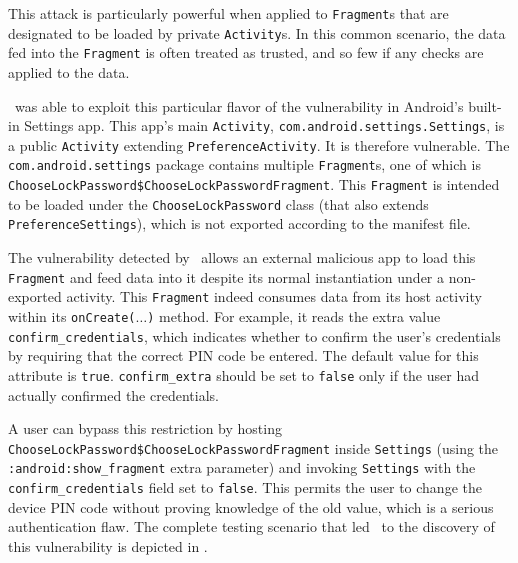This attack is particularly powerful when applied to {\tt Fragment}s that are designated to be loaded by private {\tt Activity}s. In this common scenario, the data fed into the {\tt Fragment} is often treated as trusted, and so few if any checks are applied to the data.

\Tool\ was able to exploit this particular flavor of the vulnerability in Android's built-in Settings app. This app's main {\tt Activity}, \texttt{com.android.settings.Settings},
is a public {\tt Activity}  extending \texttt{PreferenceActivity}.  It is therefore vulnerable. The
{\tt com.android.settings} package contains multiple {\tt Fragment}s, one of which is \texttt{ChooseLockPassword\$ChooseLockPasswordFragment}.
This {\tt Fragment} is intended to be loaded under the \texttt{ChooseLockPassword}
class (that also extends \texttt{PreferenceSettings}), which is not exported
according to the manifest file.

The vulnerability detected by \Tool\ allows an external malicious app to load this {\tt Fragment}
and feed data into it despite its normal instantiation under a non-exported
activity. This {\tt Fragment} indeed consumes data from its host activity
within its \texttt{onCreate($\ldots$)} method. For example, it reads the extra
value \texttt{confirm\_credentials}, which indicates whether to confirm the user's credentials
by requiring that the correct PIN code be entered. The default value for this
attribute is {\tt true}. \texttt{confirm\_extra} should be set to {\tt false}
only if the user had actually confirmed the credentials.

A user can bypass this restriction by hosting \texttt{ChooseLockPassword\$ChooseLockPasswordFragment}
inside \texttt{Settings} (using the \texttt{:android:show\_fragment}
extra parameter) and invoking \texttt{Settings} with the \texttt{confirm\_credentials}
field set to \texttt{false}. This permits the user to change the device PIN code
without proving knowledge of the old value, which is a serious authentication flaw. The complete testing scenario that led \Tool\ to the discovery of this vulnerability is depicted in .


